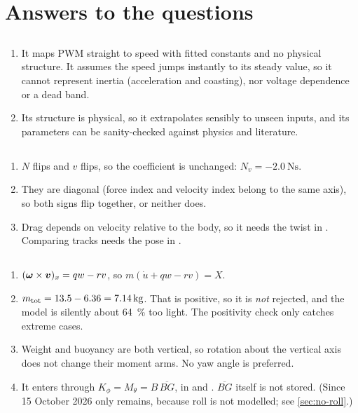 \chapter{Answers to the questions}
\label{app:answers}

\section*{}
\begin{enumerate}
  \item It maps PWM straight to speed with fitted constants and no physical structure. It
        assumes the speed jumps instantly to its steady value, so it cannot represent
        inertia (acceleration and coasting), nor voltage dependence or a dead band.
  \item Its structure is physical, so it extrapolates sensibly to unseen inputs, and its
        parameters can be sanity-checked against physics and literature.
\end{enumerate}

\section*{}
\begin{enumerate}
  \item $N$ flips and $v$ flips, so the coefficient is unchanged: $N_v = \qty{-2.0}{\newton\second}$.
  \item They are diagonal (force index and velocity index belong to the same axis), so both
        signs flip together, or neither does.
  \item Drag depends on velocity relative to the body, so it needs the twist in .
        Comparing tracks needs the pose in .
\end{enumerate}

\section*{}
\begin{enumerate}
  \item $(\boldsymbol{\omega}\times\boldsymbol{v})_x = q w - r v$, so $m(\dot u + qw - rv) = X$.
  \item $m_\mathrm{tot} = 13.5 - 6.36 = \qty{7.14}{\kilogram}$. That is positive, so it is \emph{not}
        rejected, and the model is silently about \qty{64}{\percent} too light. The positivity check only
        catches extreme cases.
  \item Weight and buoyancy are both vertical, so rotation about the vertical axis does not change
        their moment arms. No yaw angle is preferred.
  \item It enters through $K_\phi = M_\theta = B\,\overline{BG}$, in  and
        . $\overline{BG}$ itself is not stored. (Since 15 October 2026
        only  remains, because roll is not modelled; see \cref{sec:no-roll}.)
\end{enumerate}

